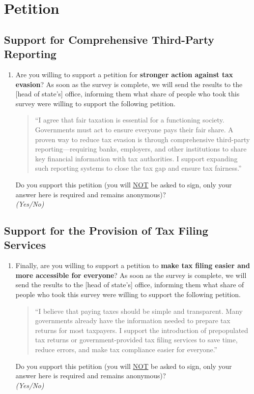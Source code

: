 \documentclass[11pt]{article}
\begin{document}
\section*{Petition}
\subsection*{Support for Comprehensive Third-Party Reporting}
\begin{enumerate}[resume]
    \item Are you willing to support a petition for \textbf{stronger action against tax evasion}? As soon as the survey is complete, we will send the results to the [head of state’s] office, informing them what share of people who took this survey were willing to support the following petition.

\begin{quote}
``I agree that fair taxation is essential for a functioning society. Governments must act to ensure everyone pays their fair share. A proven way to reduce tax evasion is through comprehensive third-party reporting---requiring banks, employers, and other institutions to share key financial information with tax authorities. I support expanding such reporting systems to close the tax gap and ensure tax fairness.''
\end{quote} 
\noindent Do you support this petition (you will \underline{NOT} be asked to sign, only your answer here is required and remains anonymous)? \\
\textit{(Yes/No)}
\end{enumerate}
\subsection*{Support for the Provision of Tax Filing Services}
\begin{enumerate}[resume]
    \item Finally, are you willing to support a petition to \textbf{make tax filing easier and more accessible for everyone}? As soon as the survey is complete, we will send the results to the [head of state’s] office, informing them what share of people who took this survey were willing to support the following petition.

    \begin{quote}
    ``I believe that paying taxes should be simple and transparent. Many governments already have the information needed to prepare tax returns for most taxpayers. I support the introduction of prepopulated tax returns or government-provided tax filing services to save time, reduce errors, and make tax compliance easier for everyone.''
    \end{quote}

    Do you support this petition (you will \underline{NOT} be asked to sign, only your answer here is required and remains anonymous)?\\
    \textit{(Yes/No)}
\end{enumerate}
\end{document}

